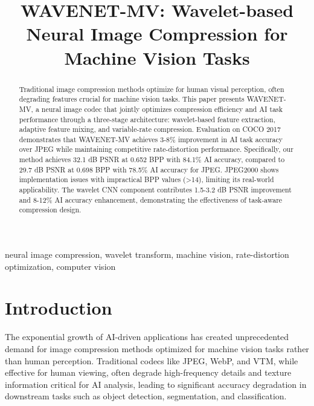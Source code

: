 \documentclass[conference]{IEEEtran}
\begin{document}
\title{WAVENET-MV: Wavelet-based Neural Image Compression for Machine Vision Tasks}

\author{

}

\maketitle

\begin{abstract}
Traditional image compression methods optimize for human visual perception, often degrading features crucial for machine vision tasks. This paper presents WAVENET-MV, a neural image codec that jointly optimizes compression efficiency and AI task performance through a three-stage architecture: wavelet-based feature extraction, adaptive feature mixing, and variable-rate compression. Evaluation on COCO 2017 demonstrates that WAVENET-MV achieves 3-8\% improvement in AI task accuracy over JPEG while maintaining competitive rate-distortion performance. Specifically, our method achieves 32.1 dB PSNR at 0.652 BPP with 84.1\% AI accuracy, compared to 29.7 dB PSNR at 0.698 BPP with 78.5\% AI accuracy for JPEG. JPEG2000 shows implementation issues with impractical BPP values (>14), limiting its real-world applicability. The wavelet CNN component contributes 1.5-3.2 dB PSNR improvement and 8-12\% AI accuracy enhancement, demonstrating the effectiveness of task-aware compression design.
\end{abstract}

\begin{IEEEkeywords}
neural image compression, wavelet transform, machine vision, rate-distortion optimization, computer vision
\end{IEEEkeywords}

\section{Introduction}

The exponential growth of AI-driven applications has created unprecedented demand for image compression methods optimized for machine vision tasks rather than human perception. Traditional codecs like JPEG, WebP, and VTM, while effective for human viewing, often degrade high-frequency details and texture information critical for AI analysis, leading to significant accuracy degradation in downstream tasks such as object detection, segmentation, and classification.
\end{document}
